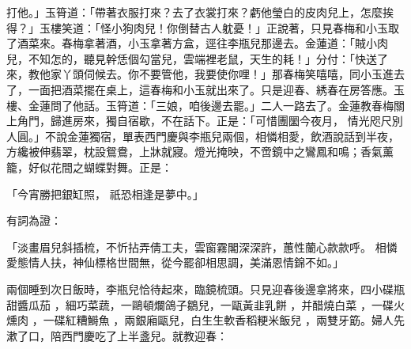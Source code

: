 打他。」玉筲道：「帶著衣服打來？去了衣裳打來？虧他瑩白的皮肉兒上，怎麼挨得？」玉樓笑道：「怪小狗肉兒！你倒替古人躭憂！」正說著，只見春梅和小玉取了酒菜來。春梅拿著酒，小玉拿著方盒，逕往李瓶兒那邊去。金蓮道：「賊小肉兒，不知怎的，聽見幹恁個勾當兒，雲端裡老鼠，天生的耗！」分付：「快送了來，教他家丫頭伺候去。你不要管他，我要使你哩！」那春梅笑嘻嘻，同小玉進去了，一面把酒菜擺在桌上，這春梅和小玉就出來了。只是迎春、綉春在房答應。玉樓、金蓮問了他話。玉筲道：「三娘，咱後邊去罷。」二人一路去了。金蓮教春梅關上角門，歸進房來，獨自宿歇，不在話下。正是：「可惜團圞今夜月，  情光咫尺別人圓。」不說金蓮獨宿，單表西門慶與李瓶兒兩個，相憐相愛，飲酒說話到半夜，方纔被伸翡翠，枕設鴛鴦，上牀就寢。燈光掩映，不啻鏡中之鸞鳳和鳴；香氣薰籠，好似花間之蝴蝶對舞。正是：

「今宵勝把銀缸照，  祇恐相逢是夢中。」

有詞為證：

「淡畫眉兒斜插梳，不忻拈弄倩工夫，雲窗霧閣深深許，蕙性蘭心款款呼。  相憐愛態情人扶，神仙標格世間無，從今罷卻相思調，美滿恩情錦不如。」

兩個睡到次日飯時，李瓶兒恰待起來，臨鏡梳頭。只見迎春後邊拿將來，四小碟瓶甜醬瓜茄 ，細巧菜蔬，一鷗頓爛鴿子鶵兒，一甌黃韭乳餅 ，并醋燒白菜 ，一碟火燻肉 ，一碟紅糟鰣魚 ，兩銀廂甌兒，白生生軟香稻粳米飯兒 ，兩雙牙筯。婦人先漱了口，陪西門慶吃了上半盞兒。就教迎春：

